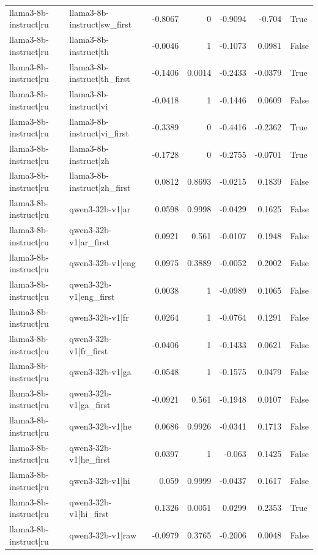 \begin{table}
\begin{tabular}{l l r r r r l}
llama3-8b-instruct|ru & llama3-8b-instruct|sw_first & -0.8067 & 0 & -0.9094 & -0.704 & True \\
llama3-8b-instruct|ru & llama3-8b-instruct|th & -0.0046 & 1 & -0.1073 & 0.0981 & False \\
llama3-8b-instruct|ru & llama3-8b-instruct|th_first & -0.1406 & 0.0014 & -0.2433 & -0.0379 & True \\
llama3-8b-instruct|ru & llama3-8b-instruct|vi & -0.0418 & 1 & -0.1446 & 0.0609 & False \\
llama3-8b-instruct|ru & llama3-8b-instruct|vi_first & -0.3389 & 0 & -0.4416 & -0.2362 & True \\
llama3-8b-instruct|ru & llama3-8b-instruct|zh & -0.1728 & 0 & -0.2755 & -0.0701 & True \\
llama3-8b-instruct|ru & llama3-8b-instruct|zh_first & 0.0812 & 0.8693 & -0.0215 & 0.1839 & False \\
llama3-8b-instruct|ru & qwen3-32b-v1|ar & 0.0598 & 0.9998 & -0.0429 & 0.1625 & False \\
llama3-8b-instruct|ru & qwen3-32b-v1|ar_first & 0.0921 & 0.561 & -0.0107 & 0.1948 & False \\
llama3-8b-instruct|ru & qwen3-32b-v1|eng & 0.0975 & 0.3889 & -0.0052 & 0.2002 & False \\
llama3-8b-instruct|ru & qwen3-32b-v1|eng_first & 0.0038 & 1 & -0.0989 & 0.1065 & False \\
llama3-8b-instruct|ru & qwen3-32b-v1|fr & 0.0264 & 1 & -0.0764 & 0.1291 & False \\
llama3-8b-instruct|ru & qwen3-32b-v1|fr_first & -0.0406 & 1 & -0.1433 & 0.0621 & False \\
llama3-8b-instruct|ru & qwen3-32b-v1|ga & -0.0548 & 1 & -0.1575 & 0.0479 & False \\
llama3-8b-instruct|ru & qwen3-32b-v1|ga_first & -0.0921 & 0.561 & -0.1948 & 0.0107 & False \\
llama3-8b-instruct|ru & qwen3-32b-v1|he & 0.0686 & 0.9926 & -0.0341 & 0.1713 & False \\
llama3-8b-instruct|ru & qwen3-32b-v1|he_first & 0.0397 & 1 & -0.063 & 0.1425 & False \\
llama3-8b-instruct|ru & qwen3-32b-v1|hi & 0.059 & 0.9999 & -0.0437 & 0.1617 & False \\
llama3-8b-instruct|ru & qwen3-32b-v1|hi_first & 0.1326 & 0.0051 & 0.0299 & 0.2353 & True \\
llama3-8b-instruct|ru & qwen3-32b-v1|raw & -0.0979 & 0.3765 & -0.2006 & 0.0048 & False \\

\end{tabular}
\end{table}

